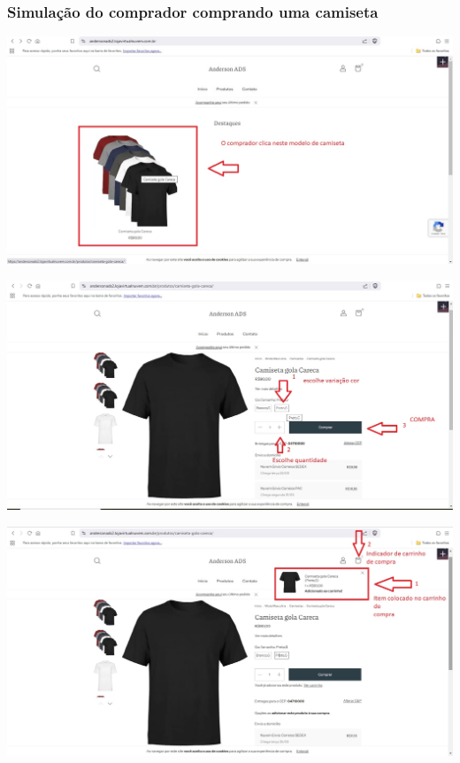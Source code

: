 \documentclass[
]{book}
\begin{document}
\subsubsection{Simulação do comprador comprando uma camiseta}\label{simulauxe7uxe3o-do-comprador-comprando-uma-camiseta}

\includegraphics{images/np1/097-loja_virtual_iniciando_compra.jpg}

\includegraphics{images/np1/098-loja_virtual_iniciando_compra2.jpg}

\includegraphics{images/np1/099-loja_virtual_iniciando_compra3.jpg}
\end{document}
